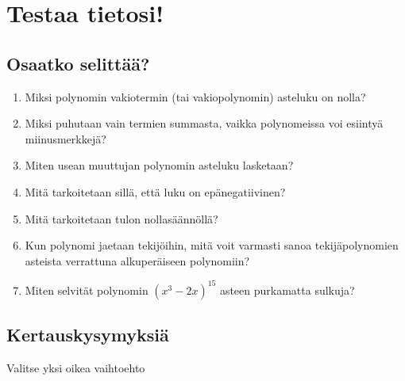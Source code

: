 
\section{Testaa tietosi!}

\subsection*{Osaatko selittää?}

\begin{enumerate}

\item Miksi polynomin vakiotermin (tai vakiopolynomin) asteluku on nolla?
\item Miksi puhutaan vain termien summasta, vaikka polynomeissa voi esiintyä miinusmerkkejä?
\item Miten usean muuttujan polynomin asteluku lasketaan?
\item Mitä tarkoitetaan sillä, että luku on epänegatiivinen?
\item Mitä tarkoitetaan tulon nollasäännöllä?
\item Kun polynomi jaetaan tekijöihin, mitä voit varmasti sanoa tekijäpolynomien asteista verrattuna alkuperäiseen polynomiin?
\item Miten selvität polynomin $(x^3-2x)^{15}$ asteen purkamatta sulkuja?


\end{enumerate}

\subsection*{Kertauskysymyksiä}

Valitse yksi oikea vaihtoehto

